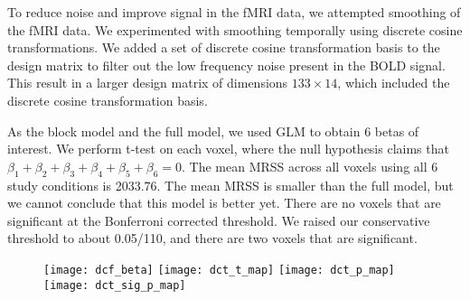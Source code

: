 To reduce noise and improve signal in the fMRI data, we attempted smoothing of
the fMRI data. We experimented with smoothing temporally using discrete cosine
transformations. We added a set of discrete cosine transformation basis to the
design matrix to filter out the low frequency noise present in the BOLD
signal. This result in a larger design matrix of dimensions $133 \times 14$,
which included the discrete cosine transformation basis.

As the block model and the full model, we used GLM to obtain 6 betas of interest.
We perform t-test on each voxel, where the null hypothesis claims that  $\beta_1
+ \beta_2 + \beta_3 + \beta_4 + \beta_5 + \beta_6= 0$. The mean MRSS across all
voxels using all 6 study conditions is 2033.76. The mean MRSS is smaller than
the full model, but we cannot conclude that this model is better yet. There are no voxels that are significant at the Bonferroni corrected threshold. We raised our
conservative threshold to about 0.05/110, and there are two voxels that are
significant.

\begin{figure} 
  
  \texttt{[image: dcf\_beta]}
  \texttt{[image: dct\_t\_map]}
  \texttt{[image: dct\_p\_map]}
  \texttt{[image: dct\_sig\_p\_map]} 

\end{figure}

